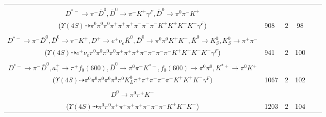 \documentclass[landscape]{article}
\newcounter{rownumbers}
\newcommand\rn{\stepcounter{rownumbers}\arabic{rownumbers}}
\newcommand{\EOLP}{\\ \hline} %
\newcommand{\topoTags}[1]{#1} %
\begin{document}
\begin{longtable}{clcccc}
\rn & \makecell[l]{ $ 
\Upsilon(4S) \rightarrow B^{0} \bar{B}^{0} ,
B^{0} \rightarrow \pi^{0} \bar{D}^{*0} ,
\bar{B}^{0} \rightarrow \bar{K}^{*} D^{+} D^{*-} ,
\bar{D}^{*0} \rightarrow \pi^{0} \bar{D}^{0} ,
\bar{K}^{*} \rightarrow \pi^{+} K^{-} ,
D^{+} \rightarrow \pi^{+} \pi^{+} K^{-} ,
$ \\ $
D^{*-} \rightarrow \pi^{-} \bar{D}^{0} ,
\bar{D}^{0} \rightarrow \pi^{-} K^{+} \gamma^{F} ,
\bar{D}^{0} \rightarrow \pi^{0} \pi^{-} K^{+} 
$ \\ ($
\Upsilon(4S) \dashrightarrow \pi^{0} \pi^{0} \pi^{0} \pi^{+} \pi^{+} \pi^{+} \pi^{-} \pi^{-} \pi^{-} K^{+} K^{+} K^{-} K^{-} \gamma^{F} 
$) } & \topoTags{908 & }2 & 98 \EOLP

\rn & \makecell[l]{ $ 
\Upsilon(4S) \rightarrow B^{0} \bar{B}^{0} ,
B^{0} \rightarrow \pi^{0} \pi^{+} D^{*-} ,
\bar{B}^{0} \rightarrow \bar{K}^{*} D^{*+} D^{*-} ,
D^{*-} \rightarrow \pi^{-} \bar{D}^{0} ,
\bar{K}^{*} \rightarrow \pi^{+} K^{-} \gamma^{F} ,
D^{*+} \rightarrow \pi^{0} D^{+} ,
$ \\ $
D^{*-} \rightarrow \pi^{-} \bar{D}^{0} ,
\bar{D}^{0} \rightarrow \pi^{-} K^{+} ,
D^{+} \rightarrow e^{+} \nu_{e} \bar{K}^{0} ,
\bar{D}^{0} \rightarrow \pi^{0} \pi^{0} K^{+} K^{-} ,
\bar{K}^{0} \rightarrow K_{S}^{0} ,
K_{S}^{0} \rightarrow \pi^{+} \pi^{-} 
$ \\ ($
\Upsilon(4S) \dashrightarrow e^{+} \nu_{e} \pi^{0} \pi^{0} \pi^{0} \pi^{0} \pi^{+} \pi^{+} \pi^{+} \pi^{-} \pi^{-} \pi^{-} \pi^{-} K^{+} K^{+} K^{-} K^{-} \gamma^{F} 
$) } & \topoTags{941 & }2 & 100 \EOLP

\rn & \makecell[l]{ $ 
\Upsilon(4S) \rightarrow B^{0} \bar{B}^{0} ,
B^{0} \rightarrow \rho^{-} K^{+} \gamma^{F} ,
\bar{B}^{0} \rightarrow \pi^{+} K^{*-} D^{+} D^{*-} ,
\rho^{-} \rightarrow \pi^{0} \pi^{-} ,
K^{*-} \rightarrow \pi^{0} K^{-} ,
D^{+} \rightarrow K_{L}^{0} a_{1}^{+} ,
$ \\ $
D^{*-} \rightarrow \pi^{-} \bar{D}^{0} ,
a_{1}^{+} \rightarrow \pi^{+} f_{0}(600) ,
\bar{D}^{0} \rightarrow \pi^{0} \pi^{-} K^{*+} ,
f_{0}(600) \rightarrow \pi^{0} \pi^{0} ,
K^{*+} \rightarrow \pi^{0} K^{+} 
$ \\ ($
\Upsilon(4S) \dashrightarrow \pi^{0} \pi^{0} \pi^{0} \pi^{0} \pi^{0} \pi^{0} K_{L}^{0} \pi^{+} \pi^{+} \pi^{-} \pi^{-} \pi^{-} K^{+} K^{+} K^{-} \gamma^{F} 
$) } & \topoTags{1067 & }2 & 102 \EOLP

\rn & \makecell[l]{ $ 
\Upsilon(4S) \rightarrow \bar{B}^{0} \bar{B}^{0} ,
\bar{B}^{0} \rightarrow \pi^{0} f_2^{\prime} ,
\bar{B}^{0} \rightarrow \rho^{0} \pi^{+} \pi^{-} \pi^{-} D^{*+} ,
f_2^{\prime} \rightarrow K^{+} K^{-} ,
\rho^{0} \rightarrow \pi^{+} \pi^{-} ,
D^{*+} \rightarrow \pi^{+} D^{0} ,
$ \\ $
D^{0} \rightarrow \pi^{0} \pi^{+} K^{-} 
$ \\ ($
\Upsilon(4S) \dashrightarrow \pi^{0} \pi^{0} \pi^{+} \pi^{+} \pi^{+} \pi^{+} \pi^{-} \pi^{-} \pi^{-} K^{+} K^{-} K^{-} 
$) } & \topoTags{1203 & }2 & 104 \EOLP


\end{longtable}
\end{document}
